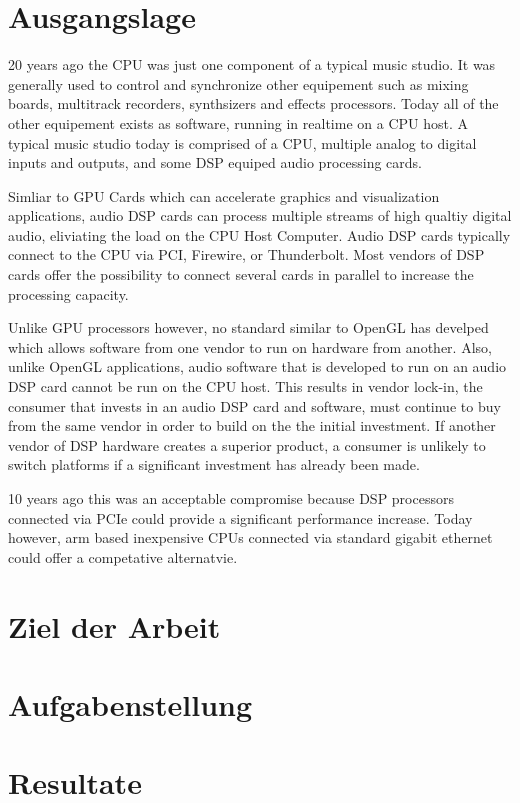 \section{Ausgangslage}

20 years ago the CPU was just one component of a typical music studio. It was generally used to control and synchronize other equipement such as mixing boards, multitrack recorders, synthsizers and
effects processors. Today all of the other equipement exists as software, running in realtime on a CPU host. A typical music studio today is comprised of a CPU, multiple analog to digital inputs and outputs, and some DSP equiped audio processing cards. 

Simliar to GPU Cards which can accelerate graphics and visualization applications, audio DSP cards can process multiple streams of high qualtiy digital audio, eliviating the load on the CPU Host Computer. Audio DSP cards typically connect to the CPU via PCI, Firewire, or Thunderbolt. Most vendors of DSP cards offer the possibility to connect several cards in parallel to increase the processing capacity.

Unlike GPU processors however, no standard similar to OpenGL has develped which allows software from one vendor to run on hardware from another. Also, unlike OpenGL applications, audio software that is developed to run on an audio DSP card cannot be run on the CPU host. This results in vendor lock-in,
the consumer that invests in an audio DSP card and software, must continue to buy from the same vendor in order to build on the the initial investment. If another vendor of DSP hardware creates a superior product, a consumer is unlikely to switch platforms if a significant investment has already been made.  

10 years ago this was an acceptable compromise because DSP processors connected via PCIe could provide a significant performance increase. Today however, arm based inexpensive CPUs connected via standard gigabit ethernet could offer a competative alternatvie. 

\section{Ziel der Arbeit}

\section{Aufgabenstellung}

\section{Resultate}